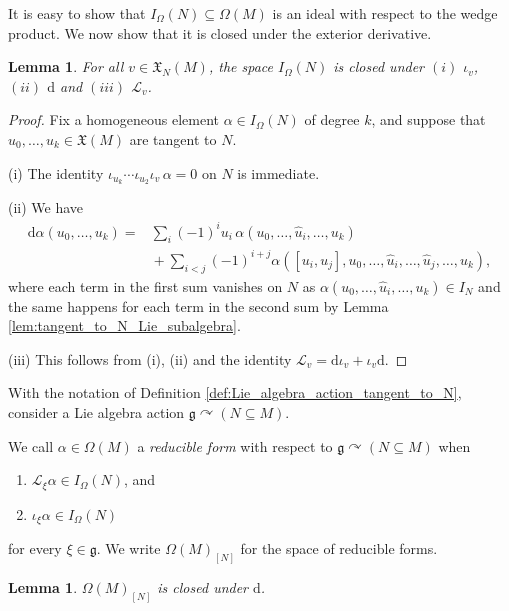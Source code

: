 \documentclass[10pt,a4paper]{amsart}
\numberwithin{equation}{section}
\newtheorem{Lemma}[Theorem]{Lemma}
\newcommand{\g}{\mathfrak{g}}
\newcommand{\tgtvanform}{I_{\Omega}(N)}
\renewcommand{\L}{\mathscr{L}}
\newcommand{\X}{\mathfrak{X}}
\renewcommand{\subset}{\subseteq}
\renewcommand{\d}{\mathrm{d}}
\begin{document}
It is easy to show that $I_\Omega(N)\subset\Omega(M)$ is an ideal with respect to the wedge product. We now show that it is closed under the exterior derivative.

\begin{Lemma}\label{lem:closure_of_I_Omega(N)}
	For all $v\in\X_N(M)$, the space $\tgtvanform$ is closed under $(i)$ $\iota_v$, $(ii)$ $\d$ and $(iii)$ $\L_v$.
\end{Lemma}

\begin{proof}
	Fix a homogeneous element $\alpha\in \tgtvanform$ of degree $k$, and suppose that $u_0,\dots,u_k\in\X(M)$ are tangent to $N$.

(i) The identity $\iota_{u_k}\cdots\iota_{u_2}\iota_v\,\alpha=0$ on $N$ is immediate.

(ii) We have
			\begin{align*}
				\d\alpha(u_0,\dots,u_k)
={}&	\sum_i (-1)^i u_i \,\alpha(u_0,\dots,\hat{u}_i,\dots,u_k)			\\
				&{}	+\sum_{i<j}(-1)^{i+j} \alpha([u_i,u_j],u_0,\dots,\hat{u}_i,\dots,\hat{u}_j,\dots,u_k),
			\end{align*}
			where each term in the first sum vanishes on $N$ as $\alpha(u_0,\dots,\hat{u}_i,\dots,u_k)\in I_N$
			and the same happens for each term in the second sum by Lemma \ref{lem:tangent_to_N_Lie_subalgebra}.

(iii) This follows from (i), (ii) and the identity $\L_v=\d\iota_v+\iota_v\d$.
\end{proof}

With the notation of Definition \ref{def:Lie_algebra_action_tangent_to_N}, consider a Lie algebra action $\g\curvearrowright(N\subset M)$.

\begin{Definition}\label{def:reducible_form}\samepage
	We call $\alpha\in\Omega(M)$ a \emph{reducible form} with respect to $\g\curvearrowright (N\subset M)$ when
	\begin{enumerate}\itemsep=0pt
		\item[(i)] $\L_\xi\alpha\in \tgtvanform$, and
		\item[(ii)] $\iota_\xi\alpha\in \tgtvanform$
	\end{enumerate}
	for every $\xi\in\g$. We write $\Omega(M)_{[N]}$ for the space of reducible forms.
\end{Definition}

\begin{Lemma}\label{lem:reducible_forms_closed_under_d}
	$\Omega(M)_{[N]}$ is closed under $\d$.
\end{Lemma}
\end{document}
